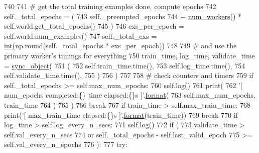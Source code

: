 \begin{DoxyCode}
740 
741                 \textcolor{comment}{# get the total training examples done, compute epochs}
742                 self.\_total\_epochs = (
743                     self.\_preempted\_epochs
744                     + \hyperlink{namespaceparlai_1_1utils_1_1distributed_a99b61b4756577c6542039c238d670dba}{num\_workers}() * self.world.get\_total\_epochs()
745                 )
746                 exs\_per\_epoch = self.world.num\_examples()
747                 self.\_total\_exs = \hyperlink{namespacelanguage__model_1_1eval__ppl_a7d12ee00479673c5c8d1f6d01faa272a}{int}(np.round(self.\_total\_epochs * exs\_per\_epoch))
748 
749                 \textcolor{comment}{# and use the primary worker's timings for everything}
750                 train\_time, log\_time, validate\_time = \hyperlink{namespaceparlai_1_1utils_1_1distributed_a269d3c7284127d9b287b9b61e9161de6}{sync\_object}(
751                     (
752                         self.train\_time.time(),
753                         self.log\_time.time(),
754                         self.validate\_time.time(),
755                     )
756                 )
757 
758                 \textcolor{comment}{# check counters and timers}
759                 \textcolor{keywordflow}{if} self.\_total\_epochs >= self.max\_num\_epochs:
760                     self.log()
761                     print(
762                         \textcolor{stringliteral}{'[ num\_epochs completed:\{\} time elapsed:\{\}s ]'}.\hyperlink{namespaceparlai_1_1chat__service_1_1services_1_1messenger_1_1shared__utils_a32e2e2022b824fbaf80c747160b52a76}{format}(
763                             self.max\_num\_epochs, train\_time
764                         )
765                     )
766                     \textcolor{keywordflow}{break}
767                 \textcolor{keywordflow}{if} train\_time > self.max\_train\_time:
768                     print(\textcolor{stringliteral}{'[ max\_train\_time elapsed:\{\}s ]'}.\hyperlink{namespaceparlai_1_1chat__service_1_1services_1_1messenger_1_1shared__utils_a32e2e2022b824fbaf80c747160b52a76}{format}(train\_time))
769                     \textcolor{keywordflow}{break}
770                 \textcolor{keywordflow}{if} log\_time > self.log\_every\_n\_secs:
771                     self.log()
772                 \textcolor{keywordflow}{if} (
773                     validate\_time > self.val\_every\_n\_secs
774                     \textcolor{keywordflow}{or} self.\_total\_epochs - self.last\_valid\_epoch
775                     >= self.val\_every\_n\_epochs
776                 ):
777                     \textcolor{keywordflow}{try}:

\end{DoxyCode}
